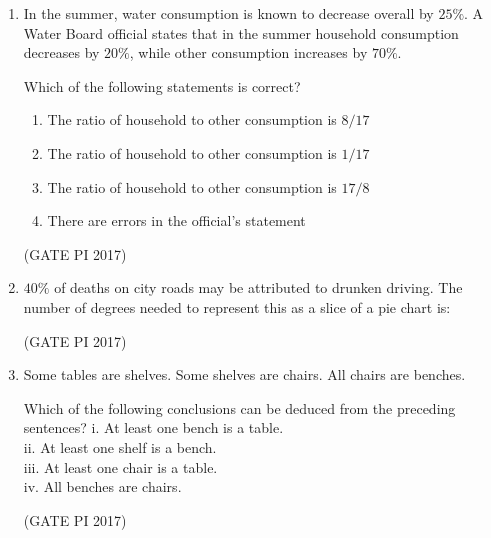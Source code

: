 \documentclass[journal,12pt,onecolumn]{IEEEtran}
\theoremstyle{remark}
\begin{document}
\begin{enumerate}
\item In the summer, water consumption is known to decrease overall by $25\%$.  
A Water Board official states that in the summer household consumption decreases by $20\%$, while other consumption increases by $70\%$.  

Which of the following statements is correct?
\begin{enumerate}
\item The ratio of household to other consumption is $8/17$
\item The ratio of household to other consumption is $1/17$
\item The ratio of household to other consumption is $17/8$
\item There are errors in the official's statement
\end{enumerate}
\hfill (GATE PI 2017)

\item $40\%$ of deaths on city roads may be attributed to drunken driving.  
The number of degrees needed to represent this as a slice of a pie chart is:
\begin{enumerate}
\end{enumerate}
\hfill (GATE PI 2017)

\item Some tables are shelves.  
Some shelves are chairs.  
All chairs are benches.  

Which of the following conclusions can be deduced from the preceding sentences?  
i. At least one bench is a table.  \\
ii. At least one shelf is a bench.  \\
iii. At least one chair is a table.  \\
iv. All benches are chairs.\\
\begin{enumerate}
\end{enumerate}
\hfill (GATE PI 2017)


\end{enumerate}
\end{document}

